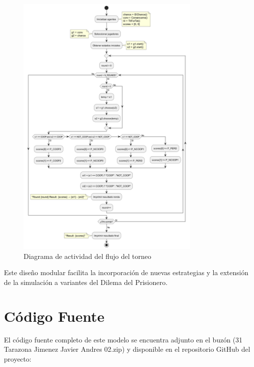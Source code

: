 \documentclass{article}
\begin{document}
\begin{figure}[H]        
  \centering             
  \includegraphics[width=0.8\textwidth]{diagrams/flow_tournament.png}
  \caption{Diagrama de actividad del flujo del torneo}
  \label{fig:flow_tourna}
\end{figure}

Este diseño modular facilita la incorporación de nuevas estrategias y 
la extensión de la simulación a variantes del Dilema del Prisionero.



\section{Código Fuente}\label{sec:cod}

El código fuente completo de este modelo se encuentra adjunto en el buzón 
(31 Tarazona Jimenez Javier Andres 02.zip)
y disponible en el repositorio GitHub del proyecto:
\end{document}
